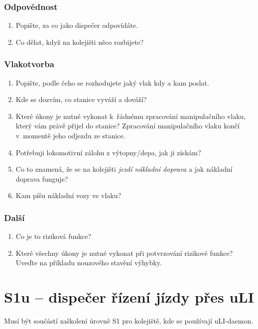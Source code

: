 \documentclass[12pt,a4paper]{article}
\begin{document}
\subsubsection*{Odpovědnost}
\begin{enumerate}[leftmargin=*]
\item Popište, za co jako dispečer odpovídáte.
\item Co dělat, když na kolejišti něco rozbijete?
\end{enumerate}

\subsubsection*{Vlakotvorba}
\begin{enumerate}[leftmargin=*]
\item Popište, podle čeho se rozhodujete jaký vlak kdy a kam poslat.
\item Kde se dozvím, co stanice vyváží a dováží?
\item Které úkony je nutné vykonat k~řádnému zpracování manipulačního vlaku,
který vám právě přijel do stanice? Zpracování manipulačního vlaku končí
v~momentě jeho odjezdu ze stanice.
\item Potřebuji lokomotivní zálohu z výtopny/depa, jak ji získám?
\item Co to znamená, že se na kolejišti \textit{jezdí nákladní doprava} a jak
nákladní doprava funguje?
\item Kam píšu nákladní vozy ve vlaku?
\end{enumerate}

\subsubsection*{Další}
\begin{enumerate}[leftmargin=*]
\item Co je to riziková funkce?
\item Které všechny úkony je nutné vykonat při potvrzování rizikové funkce?
Uveďte na příkladu nouzového stavění výhybky.
\end{enumerate}


\newpage
\section{S1u – dispečer řízení jízdy přes uLI}

Musí být součástí zaškolení úrovně S1 pro kolejiště, kde se používají
uLI-daemon.
\end{document}
